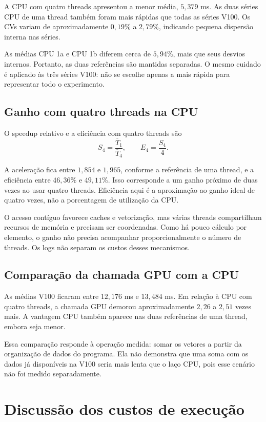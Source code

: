 \documentclass[12pt,a4paper]{article}
\begin{document}
A CPU com quatro threads apresentou a menor média, $5{,}379$ ms. As duas séries CPU de uma thread também foram mais rápidas que todas as séries V100. Os CVs variam de aproximadamente $0{,}19\%$ a $2{,}79\%$, indicando pequena dispersão interna nas séries.

As médias CPU 1a e CPU 1b diferem cerca de $5{,}94\%$, mais que seus desvios internos. Portanto, as duas referências são mantidas separadas. O mesmo cuidado é aplicado às três séries V100: não se escolhe apenas a mais rápida para representar todo o experimento.

\subsection{Ganho com quatro threads na CPU}
O speedup relativo e a eficiência com quatro threads são
\[
S_4=\frac{\overline T_1}{\overline T_4},\qquad E_4=\frac{S_4}{4}.
\]
{\small}

A aceleração fica entre $1{,}854$ e $1{,}965$, conforme a referência de uma thread, e a eficiência entre $46{,}36\%$ e $49{,}11\%$. Isso corresponde a um ganho próximo de duas vezes ao usar quatro threads. Eficiência aqui é a aproximação ao ganho ideal de quatro vezes, não a porcentagem de utilização da CPU.

O acesso contíguo favorece caches e vetorização, mas várias threads compartilham recursos de memória e precisam ser coordenadas. Como há pouco cálculo por elemento, o ganho não precisa acompanhar proporcionalmente o número de threads. Os logs não separam os custos desses mecanismos.

\subsection{Comparação da chamada GPU com a CPU}
{\small}

As médias V100 ficaram entre $12{,}176$ ms e $13{,}484$ ms. Em relação à CPU com quatro threads, a chamada GPU demorou aproximadamente $2{,}26$ a $2{,}51$ vezes mais. A vantagem CPU também aparece nas duas referências de uma thread, embora seja menor.

Essa comparação responde à operação medida: somar os vetores a partir da organização de dados do programa. Ela não demonstra que uma soma com os dados já disponíveis na V100 seria mais lenta que o laço CPU, pois esse cenário não foi medido separadamente.

\section{Discussão dos custos de execução}
\end{document}
